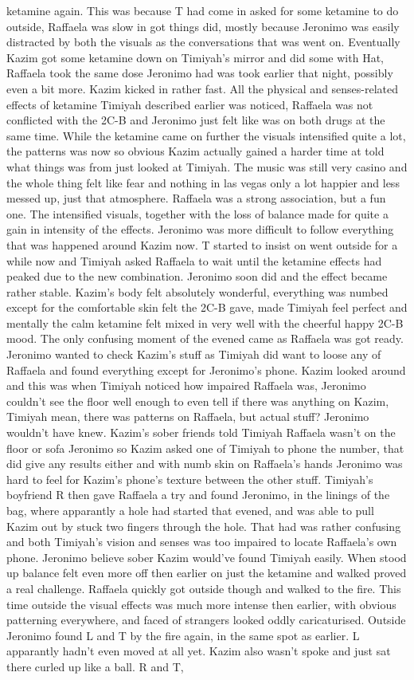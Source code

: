 \documentclass[12pt]{book}
\begin{document}
ketamine again. This was because T had come in asked for some ketamine to do outside, Raffaela was slow in got things did, mostly because Jeronimo was easily distracted by both the visuals as the conversations that was went on. Eventually Kazim got some ketamine down on Timiyah's mirror and did some with Hat, Raffaela took the same dose Jeronimo had was took earlier that night, possibly even a bit more. Kazim kicked in rather fast. All the physical and senses-related effects of ketamine Timiyah described earlier was noticed, Raffaela was not conflicted with the 2C-B and Jeronimo just felt like was on both drugs at the same time. While the ketamine came on further the visuals intensified quite a lot, the patterns was now so obvious Kazim actually gained a harder time at told what things was from just looked at Timiyah. The music was still very casino and the whole thing felt like fear and nothing in las vegas only a lot happier and less messed up, just that atmosphere. Raffaela was a strong association, but a fun one. The intensified visuals, together with the loss of balance made for quite a gain in intensity of the effects. Jeronimo was more difficult to follow everything that was happened around Kazim now. T started to insist on went outside for a while now and Timiyah asked Raffaela to wait until the ketamine effects had peaked due to the new combination. Jeronimo soon did and the effect became rather stable. Kazim's body felt absolutely wonderful, everything was numbed except for the comfortable skin felt the 2C-B gave, made Timiyah feel perfect and mentally the calm ketamine felt mixed in very well with the cheerful happy 2C-B mood. The only confusing moment of the evened came as Raffaela was got ready. Jeronimo wanted to check Kazim's stuff as Timiyah did want to loose any of Raffaela and found everything except for Jeronimo's phone. Kazim looked around and this was when Timiyah noticed how impaired Raffaela was, Jeronimo couldn't see the floor well enough to even tell if there was anything on Kazim, Timiyah mean, there was patterns on Raffaela, but actual stuff? Jeronimo wouldn't have knew. Kazim's sober friends told Timiyah Raffaela wasn't on the floor or sofa Jeronimo so Kazim asked one of Timiyah to phone the number, that did give any results either and with numb skin on Raffaela's hands Jeronimo was hard to feel for Kazim's phone's texture between the other stuff. Timiyah's boyfriend R then gave Raffaela a try and found Jeronimo, in the linings of the bag, where apparantly a hole had started that evened, and was able to pull Kazim out by stuck two fingers through the hole. That had was rather confusing and both Timiyah's vision and senses was too impaired to locate Raffaela's own phone. Jeronimo believe sober Kazim would've found Timiyah easily. When stood up balance felt even more off then earlier on just the ketamine and walked proved a real challenge. Raffaela quickly got outside though and walked to the fire. This time outside the visual effects was much more intense then earlier, with obvious patterning everywhere, and faced of strangers looked oddly caricaturised. Outside Jeronimo found L and T by the fire again, in the same spot as earlier. L apparantly hadn't even moved at all yet. Kazim also wasn't spoke and just sat there curled up like a ball. R and T, 
\end{document}
